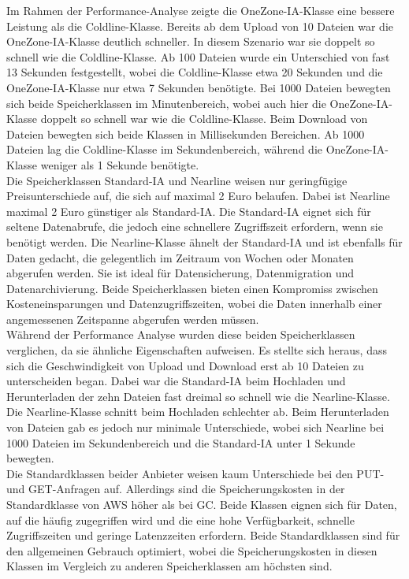 Im Rahmen der Performance-Analyse zeigte die OneZone-IA-Klasse eine bessere Leistung als die Coldline-Klasse. Bereits ab dem Upload von 10 Dateien war die OneZone-IA-Klasse deutlich schneller. In diesem Szenario war sie doppelt so schnell wie die Coldline-Klasse. Ab 100 Dateien wurde ein Unterschied von fast 13 Sekunden festgestellt, wobei die Coldline-Klasse etwa 20 Sekunden und die OneZone-IA-Klasse nur etwa 7 Sekunden benötigte. Bei 1000 Dateien bewegten sich beide Speicherklassen im Minutenbereich, wobei auch hier die OneZone-IA-Klasse doppelt so schnell war wie die Coldline-Klasse. Beim Download von Dateien bewegten sich beide Klassen in Millisekunden Bereichen. Ab 1000 Dateien lag die Coldline-Klasse im Sekundenbereich, während die OneZone-IA-Klasse weniger als 1 Sekunde benötigte.\\

Die Speicherklassen Standard-IA und Nearline weisen nur geringfügige Preisunterschiede auf, die sich auf maximal 2 Euro belaufen. Dabei ist Nearline maximal 2 Euro günstiger als Standard-IA. Die Standard-IA eignet sich für seltene Datenabrufe, die jedoch eine schnellere Zugriffszeit erfordern, wenn sie benötigt werden. Die Nearline-Klasse ähnelt der Standard-IA und ist ebenfalls für Daten gedacht, die gelegentlich im Zeitraum von Wochen oder Monaten abgerufen werden. Sie ist ideal für Datensicherung, Datenmigration und Datenarchivierung. Beide Speicherklassen bieten einen Kompromiss zwischen Kosteneinsparungen und Datenzugriffszeiten, wobei die Daten innerhalb einer angemessenen Zeitspanne abgerufen werden müssen.\\

Während der Performance Analyse wurden diese beiden Speicherklassen verglichen, da sie ähnliche Eigenschaften aufweisen. Es stellte sich heraus, dass sich die Geschwindigkeit von Upload und Download erst ab 10 Dateien zu unterscheiden began. Dabei war die Standard-IA beim Hochladen und Herunterladen der zehn Dateien fast dreimal so schnell wie die Nearline-Klasse. Die Nearline-Klasse schnitt beim Hochladen schlechter ab. Beim Herunterladen von Dateien gab es jedoch nur minimale Unterschiede, wobei sich Nearline bei 1000 Dateien im Sekundenbereich und die Standard-IA unter 1 Sekunde bewegten.\\

Die Standardklassen beider Anbieter weisen kaum Unterschiede bei den PUT- und GET-Anfragen auf. Allerdings sind die Speicherungskosten in der Standardklasse von AWS höher als bei GC. Beide Klassen eignen sich für Daten, auf die häufig zugegriffen wird und die eine hohe Verfügbarkeit, schnelle Zugriffszeiten und geringe Latenzzeiten erfordern. Beide Standardklassen sind für den allgemeinen Gebrauch optimiert, wobei die Speicherungskosten in diesen Klassen im Vergleich zu anderen Speicherklassen am höchsten sind.\\

